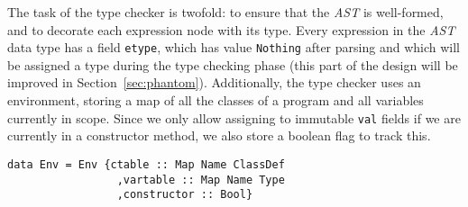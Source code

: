 \documentclass[sigplan,screen]{acmart}
\makeatletter
\newcommand{\ec}[1]{\lstinline[style=encore,breaklines=true,basicstyle=\fontsize{9}{9}\tt]@#1@}
\newcommand{\astt}[0]{\textit{AST}}
\makeatother
\begin{document}
%
%
%
%

The task of the type checker is twofold: to ensure that the
\astt{} is well-formed, and to decorate each expression node with
its type.
%
Every expression in the \astt{} data type has a field \ec{etype},
which has value \ec{Nothing} after parsing and which will be
assigned a type during the type checking phase (this part of the
design will be improved in Section~\ref{sec:phantom}).
%
Additionally, the type checker uses an environment, storing a map
of all the classes of a program and all variables currently in
scope.
%
Since we only allow assigning to immutable \ec{val} fields if we
are currently in a constructor method, we also store a boolean
flag to track this.

\begin{minipage}[t]{\linewidth}
\begin{lstlisting}[style=encore]
data Env = Env {ctable :: Map Name ClassDef
                 ,vartable :: Map Name Type
                 ,constructor :: Bool}
\end{lstlisting}
\end{minipage}
\end{document}
